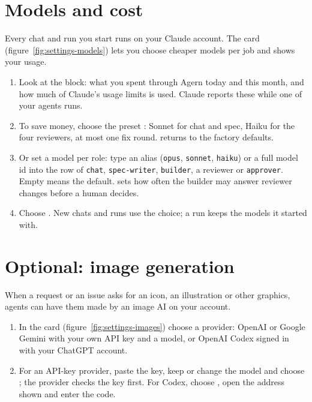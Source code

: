 
\section{Models and cost}\label{sec:models}

Every chat and run you start runs on your Claude account. The  card
(figure~\ref{fig:settings-models}) lets you choose cheaper models per job and shows your usage.

\begin{enumerate}
  \item Look at the  block: what you spent through Agern today and this month, and how
    much of Claude's usage limits is used. Claude reports these while one of your agents runs.
  \item To save money, choose the preset : Sonnet for chat and spec, Haiku for the four
    reviewers, at most one fix round.  returns to the factory defaults.
  \item Or set a model per role: type an alias (\texttt{opus}, \texttt{sonnet}, \texttt{haiku}) or
    a full model id into the row of \texttt{chat}, \texttt{spec-writer}, \texttt{builder}, a
    reviewer or \texttt{approver}. Empty means the default.  sets how often the
    builder may answer reviewer changes before a human decides.
  \item Choose . New chats and runs use the choice; a run keeps the models it
    started with.
\end{enumerate}


\section{Optional: image generation}\label{sec:images}

When a request or an issue asks for an icon, an illustration or other graphics, agents can have
them made by an image AI on your account.

\begin{enumerate}
  \item In the  card (figure~\ref{fig:settings-images}) choose a provider:
    OpenAI or Google Gemini with your own API key and a model, or OpenAI Codex signed in with your
    ChatGPT account.
  \item For an API-key provider, paste the key, keep or change the model and choose ; the
    provider checks the key first. For Codex, choose , open the address shown
    and enter the code.
\end{enumerate}

